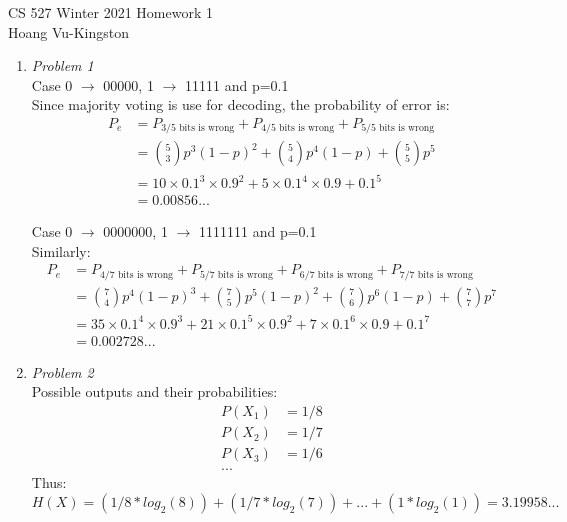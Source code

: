 \documentclass[12pt]{article}
\begin{document}
CS 527 Winter 2021 \hfill Homework 1\\
Hoang Vu-Kingston

\hrulefill

\begin{enumerate}

	\item\textit{Problem 1}\\
    Case 0 $\rightarrow$ 00000, 1 $\rightarrow$ 11111 and p=0.1\\
    Since majority voting is use for decoding, the probability of error is:
    \begin{align*}
        P_e  &= P_{\text{3/5 bits is wrong}} + P_{\text{4/5 bits is wrong}} + P_{\text{5/5 bits is wrong}} \\
        &= {5 \choose 3}p^3(1-p)^2 + {5 \choose 4}p^4(1-p) + {5 \choose 5}p^5\\
        &= 10 \times 0.1^3 \times 0.9^2 + 5 \times 0.1^4 \times 0.9 + 0.1^5\\
        &= 0.00856...
    \end{align*}

    Case 0 $\rightarrow$ 0000000, 1 $\rightarrow$ 1111111 and p=0.1\\
    Similarly:
    \begin{align*}
        P_e  &= P_{\text{4/7 bits is wrong}} + P_{\text{5/7 bits is wrong}} + P_{\text{6/7 bits is wrong}} + P_{\text{7/7 bits is wrong}}\\
        &= {7 \choose 4}p^4(1-p)^3 + {7 \choose 5}p^5(1-p)^2 + {7 \choose 6}p^6(1-p) + {7 \choose 7}p^7\\
        &= 35 \times 0.1^4 \times 0.9^3 + 21 \times 0.1^5 \times 0.9^2 + 7 \times 0.1^6 \times 0.9 + 0.1^7\\
        &= 0.002728...
    \end{align*}

    \item\textit{Problem 2}\\
    Possible outputs and their probabilities:
    \begin{align*}
        P(X_1) &= 1/8\\
        P(X_2) & = 1/7\\
        P(X_3) & = 1/6\\
        ...
    \end{align*}
    Thus:
    \begin{equation*}
        H(X) = (1/8*log_2(8)) + (1/7*log_2(7)) + ... + (1*log_2(1)) = 3.19958...
    \end{equation*}


\end{enumerate}
\end{document}

